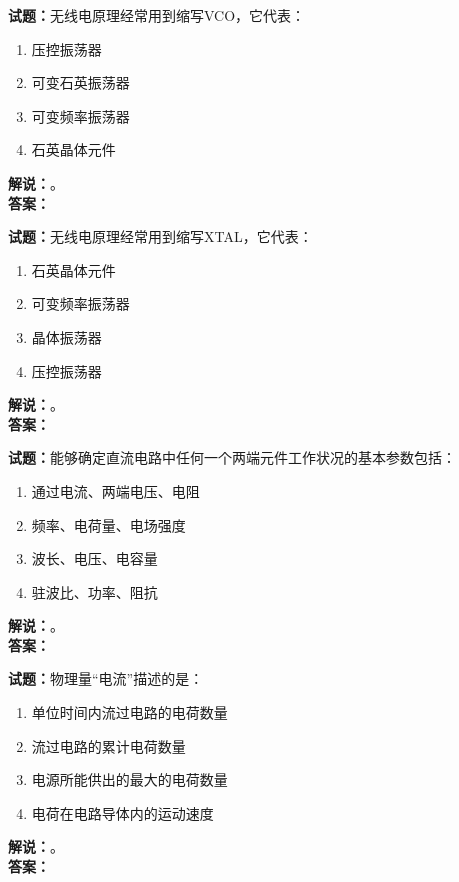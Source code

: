 \documentclass{ctexbook}
\begin{document}
\bigskip

\noindent\textbf{试题：}无线电原理经常用到缩写VCO，它代表：
\begin{enumerate}[leftmargin=3em]
  \item 压控振荡器
  \item 可变石英振荡器
  \item 可变频率振荡器
  \item 石英晶体元件
\end{enumerate}
\noindent\textbf{解说：}\textbf{}。\\\noindent\textbf{答案：}

\bigskip

\noindent\textbf{试题：}无线电原理经常用到缩写XTAL，它代表：
\begin{enumerate}[leftmargin=3em]
  \item 石英晶体元件
  \item 可变频率振荡器
  \item 晶体振荡器
  \item 压控振荡器
\end{enumerate}
\noindent\textbf{解说：}\textbf{}。\\\noindent\textbf{答案：}

\bigskip

\noindent\textbf{试题：}能够确定直流电路中任何一个两端元件工作状况的基本参数包括：
\begin{enumerate}[leftmargin=3em]
  \item 通过电流、两端电压、电阻
  \item 频率、电荷量、电场强度
  \item 波长、电压、电容量
  \item 驻波比、功率、阻抗
\end{enumerate}
\noindent\textbf{解说：}\textbf{}。\\\noindent\textbf{答案：}

\bigskip

\noindent\textbf{试题：}物理量“电流”描述的是：
\begin{enumerate}[leftmargin=3em]
  \item 单位时间内流过电路的电荷数量
  \item 流过电路的累计电荷数量
  \item 电源所能供出的最大的电荷数量
  \item 电荷在电路导体内的运动速度
\end{enumerate}
\noindent\textbf{解说：}\textbf{}。\\\noindent\textbf{答案：}
\end{document}
